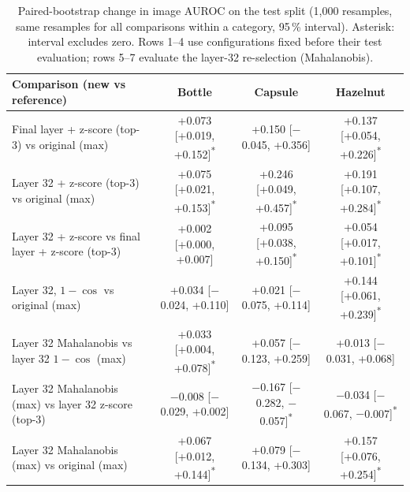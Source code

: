 \begin{table}[t]
\caption{Paired-bootstrap change in image AUROC on the test split (1,000 resamples, same resamples for all comparisons within a category, 95\,\% interval). Asterisk: interval excludes zero. Rows 1--4 use configurations fixed before their test evaluation; rows 5--7 evaluate the layer-32 re-selection (Mahalanobis).}
\label{tab:boot2}
\centering
\scriptsize
\setlength{\tabcolsep}{3pt}
\begin{tabular}{lccc}
\hline
\textbf{Comparison (new vs reference)} & \textbf{Bottle} & \textbf{Capsule} & \textbf{Hazelnut} \\
\hline
Final layer + z-score (top-3) vs original (max) & +0.073 [+0.019, +0.152]\textsuperscript{*} & +0.150 [$-$0.045, +0.356] & +0.137 [+0.054, +0.226]\textsuperscript{*} \\
Layer 32 + z-score (top-3) vs original (max) & +0.075 [+0.021, +0.153]\textsuperscript{*} & +0.246 [+0.049, +0.457]\textsuperscript{*} & +0.191 [+0.107, +0.284]\textsuperscript{*} \\
Layer 32 + z-score vs final layer + z-score (top-3) & +0.002 [+0.000, +0.007] & +0.095 [+0.038, +0.150]\textsuperscript{*} & +0.054 [+0.017, +0.101]\textsuperscript{*} \\
Layer 32, $1-\cos$ vs original (max) & +0.034 [$-$0.024, +0.110] & +0.021 [$-$0.075, +0.114] & +0.144 [+0.061, +0.239]\textsuperscript{*} \\
Layer 32 Mahalanobis vs layer 32 $1-\cos$ (max) & +0.033 [+0.004, +0.078]\textsuperscript{*} & +0.057 [$-$0.123, +0.259] & +0.013 [$-$0.031, +0.068] \\
Layer 32 Mahalanobis (max) vs layer 32 z-score (top-3) & $-$0.008 [$-$0.029, +0.002] & $-$0.167 [$-$0.282, $-$0.057]\textsuperscript{*} & $-$0.034 [$-$0.067, $-$0.007]\textsuperscript{*} \\
Layer 32 Mahalanobis (max) vs original (max) & +0.067 [+0.012, +0.144]\textsuperscript{*} & +0.079 [$-$0.134, +0.303] & +0.157 [+0.076, +0.254]\textsuperscript{*} \\
\hline
\end{tabular}
\end{table}
